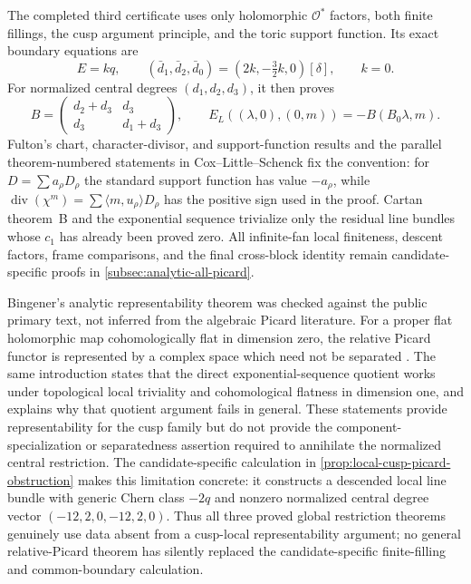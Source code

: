 The completed third certificate uses only holomorphic $\mathcal O^*$ factors,
both finite fillings, the cusp argument principle, and the toric support
function.  Its exact boundary equations are
\[
 E=kq,\qquad
 (\bar d_1,\bar d_2,\bar d_0)
   =(2k,-\tfrac32k,0)[\delta],\qquad k=0.
\]
For normalized central degrees $(d_1,d_2,d_3)$, it then proves
\[
 B=\begin{pmatrix}d_2+d_3&d_3\\d_3&d_1+d_3\end{pmatrix},
 \qquad E_L((\lambda,0),(0,m))=-B(B_0\lambda,m).
\]
Fulton's chart, character-divisor, and support-function results
\cite[\S2.1, pp.~28--29; \S3.3, pp.~60--63; \S3.4,
pp.~63--72]{Fulton1993} and the parallel theorem-numbered statements in
Cox--Little--Schenck
\cite[Example~1.2.21, p.~31; Propositions~4.1.1--4.1.2, p.~171;
Theorems~4.2.8, p.~179 and~4.2.12, p.~182]{CoxLittleSchenck2011}
fix the convention: for $D=\sum a_\rho D_\rho$ the standard support function
has value $-a_\rho$, while
$\operatorname{div}(\chi^m)=\sum\langle m,u_\rho\rangle D_\rho$ has the
positive sign used in the proof.  Cartan theorem~B
\cite[\S2, fundamental theorem, p.~81]{Cartan1957} and the exponential
sequence \cite[Proposition~6.28 and equations~(6.35)--(6.36),
pp.~180--182]{Lee2024} trivialize only the residual line bundles whose
$c_1$ has already been proved zero.  All infinite-fan local finiteness,
descent factors, frame comparisons, and the final cross-block identity remain
candidate-specific proofs in \cref{subsec:analytic-all-picard}.

Bingener's analytic representability theorem was checked against the public
primary text, not inferred from the algebraic Picard literature.  For a
proper flat holomorphic map cohomologically flat in dimension zero, the
relative Picard functor is represented by a complex space which need not be
separated \cite[Introduction, p.~318; Satz~6.2, pp.~336--337]{Bingener1980}.
The same introduction states that the direct exponential-sequence quotient
works under topological local triviality and cohomological flatness in
dimension one, and explains why that quotient argument fails in general.
These statements provide representability for the cusp family but do not
provide the component-specialization or separatedness assertion required to
annihilate the normalized central restriction.  The candidate-specific
calculation in \cref{prop:local-cusp-picard-obstruction} makes this limitation
concrete: it constructs a descended local line bundle with generic Chern
class \(-2q\) and nonzero normalized central degree vector
\((-12,2,0,-12,2,0)\).  Thus all three proved global restriction theorems
genuinely use data absent from a cusp-local representability argument; no
general relative-Picard theorem has silently replaced the candidate-specific
finite-filling and common-boundary calculation.

